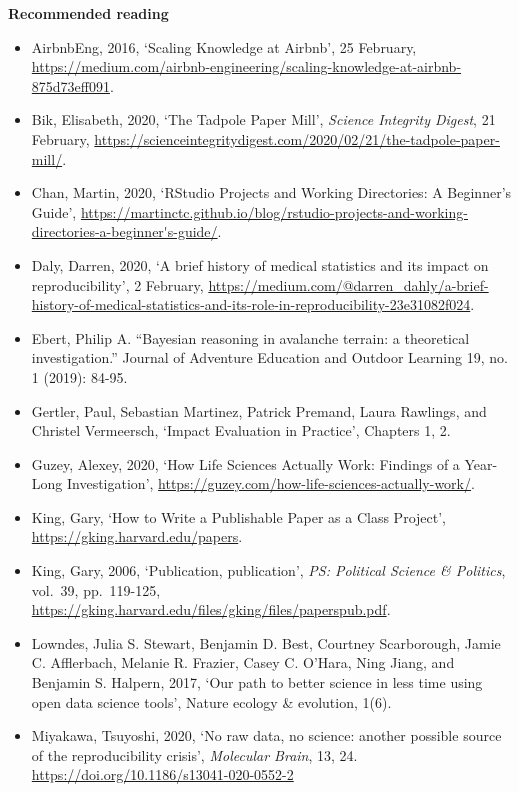 \documentclass[
]{book}
\providecommand{\tightlist}{%
  \setlength{\itemsep}{0pt}\setlength{\parskip}{0pt}}
\begin{document}
\textbf{Recommended reading}

\begin{itemize}
\tightlist
\item
  AirbnbEng, 2016, `Scaling Knowledge at Airbnb', 25 February, \url{https://medium.com/airbnb-engineering/scaling-knowledge-at-airbnb-875d73eff091}.
\item
  Bik, Elisabeth, 2020, `The Tadpole Paper Mill', \emph{Science Integrity Digest}, 21 February, \url{https://scienceintegritydigest.com/2020/02/21/the-tadpole-paper-mill/}.
\item
  Chan, Martin, 2020, `RStudio Projects and Working Directories: A Beginner's Guide', \url{https://martinctc.github.io/blog/rstudio-projects-and-working-directories-a-beginner's-guide/}.
\item
  Daly, Darren, 2020, `A brief history of medical statistics and its impact on reproducibility', 2 February, \url{https://medium.com/@darren_dahly/a-brief-history-of-medical-statistics-and-its-role-in-reproducibility-23e31082f024}.
\item
  Ebert, Philip A. ``Bayesian reasoning in avalanche terrain: a theoretical investigation.'' Journal of Adventure Education and Outdoor Learning 19, no. 1 (2019): 84-95.
\item
  Gertler, Paul, Sebastian Martinez, Patrick Premand, Laura Rawlings, and Christel Vermeersch, `Impact Evaluation in Practice', Chapters 1, 2.
\item
  Guzey, Alexey, 2020, `How Life Sciences Actually Work: Findings of a Year-Long Investigation', \url{https://guzey.com/how-life-sciences-actually-work/}.
\item
  King, Gary, `How to Write a Publishable Paper as a Class Project', \url{https://gking.harvard.edu/papers}.
\item
  King, Gary, 2006, `Publication, publication', \emph{PS: Political Science \& Politics}, vol.~39, pp.~119-125, \url{https://gking.harvard.edu/files/gking/files/paperspub.pdf}.
\item
  Lowndes, Julia S. Stewart, Benjamin D. Best, Courtney Scarborough, Jamie C. Afflerbach, Melanie R. Frazier, Casey C. O'Hara, Ning Jiang, and Benjamin S. Halpern, 2017, `Our path to better science in less time using open data science tools', Nature ecology \& evolution, 1(6).
\item
  Miyakawa, Tsuyoshi, 2020, `No raw data, no science: another possible source of the reproducibility crisis', \emph{Molecular Brain}, 13, 24. \url{https://doi.org/10.1186/s13041-020-0552-2}

\end{itemize}
\end{document}
